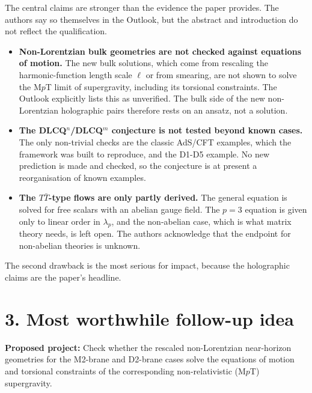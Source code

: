 \documentclass[11pt]{article}
\begin{document}
The central claims are stronger than the evidence the paper provides. The authors say so themselves in the Outlook, but the abstract and introduction do not reflect the qualification.

\begin{itemize}
\item \textbf{Non-Lorentzian bulk geometries are not checked against equations of motion.} The new bulk solutions, which come from rescaling the harmonic-function length scale $\ell$ or from smearing, are not shown to solve the M$p$T limit of supergravity, including its torsional constraints. The Outlook explicitly lists this as unverified. The bulk side of the new non-Lorentzian holographic pairs therefore rests on an ansatz, not a solution.
\item \textbf{The DLCQ$^n$/DLCQ$^m$ conjecture is not tested beyond known cases.} The only non-trivial checks are the classic AdS/CFT examples, which the framework was built to reproduce, and the D1-D5 example. No new prediction is made and checked, so the conjecture is at present a reorganisation of known examples.
\item \textbf{The $T\bar T$-type flows are only partly derived.} The general equation is solved for free scalars with an abelian gauge field. The $p=3$ equation is given only to linear order in $\lambda_p$, and the non-abelian case, which is what matrix theory needs, is left open. The authors acknowledge that the endpoint for non-abelian theories is unknown.
\end{itemize}

The second drawback is the most serious for impact, because the holographic claims are the paper's headline.

\section*{3. Most worthwhile follow-up idea}

\textbf{Proposed project:} Check whether the rescaled non-Lorentzian near-horizon geometries for the M2-brane and D2-brane cases solve the equations of motion and torsional constraints of the corresponding non-relativistic (M$p$T) supergravity.
\end{document}
